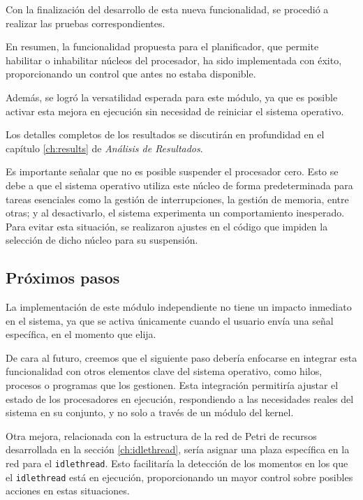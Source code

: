 Con la finalización del desarrollo de esta nueva funcionalidad, se procedió a realizar las pruebas correspondientes.\par

En resumen, la funcionalidad propuesta para el planificador, que permite habilitar o inhabilitar núcleos del procesador, ha sido implementada con éxito, proporcionando un control que antes no estaba disponible.\par

Además, se logró la versatilidad esperada para este módulo, ya que es posible activar esta mejora en ejecución sin necesidad de reiniciar el sistema operativo.\par

Los detalles completos de los resultados se discutirán en profundidad en el capítulo \ref{ch:results} de \textit{Análisis de Resultados}.\par

Es importante señalar que no es posible suspender el procesador cero. Esto se debe a que el sistema operativo utiliza este núcleo de forma predeterminada para tareas esenciales como la gestión de interrupciones, la gestión de memoria, entre otras; y al desactivarlo, el sistema experimenta un comportamiento inesperado. Para evitar esta situación, se realizaron ajustes en el código que impiden la selección de dicho núcleo para su suspensión.\par

\subsection{Próximos pasos}

La implementación de este módulo independiente no tiene un impacto inmediato en el sistema, ya que se activa únicamente cuando el usuario envía una señal específica, en el momento que elija.\par

De cara al futuro, creemos que el siguiente paso debería enfocarse en integrar esta funcionalidad con otros elementos clave del sistema operativo, como hilos, procesos o programas que los gestionen. Esta integración permitiría ajustar el estado de los procesadores en ejecución, respondiendo a las necesidades reales del sistema en su conjunto, y no solo a través de un módulo del kernel.\par

Otra mejora, relacionada con la estructura de la red de Petri de recursos desarrollada en la sección \ref{ch:idlethread}, sería asignar una plaza específica en la red para el \texttt{idlethread}. Esto facilitaría la detección de los momentos en los que el \texttt{idlethread} está en ejecución, proporcionando un mayor control sobre posibles acciones en estas situaciones.\par

